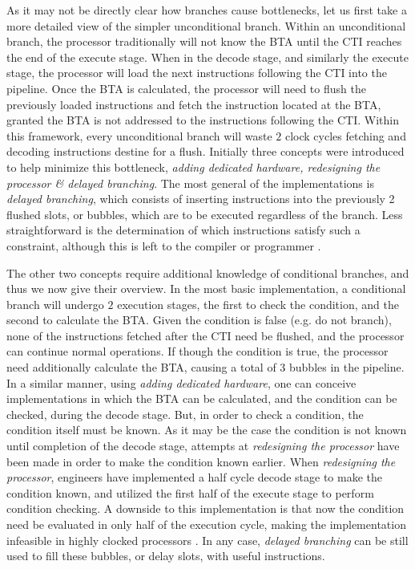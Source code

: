 \documentclass{article}
\begin{document}
As it may not be directly clear how branches cause bottlenecks, let us first take a more detailed view of the simpler unconditional branch.
Within an unconditional branch, the processor traditionally will not know the BTA until the CTI reaches the end of the execute stage.
When in the decode stage, and similarly the execute stage, the processor will load the next instructions following the CTI into the pipeline.
Once the BTA is calculated, the processor will need to flush the previously loaded instructions and fetch the instruction located at the BTA, granted the BTA is not addressed to the instructions following the CTI.
Within this framework, every unconditional branch will waste $2$ clock cycles fetching and decoding instructions destine for a flush.
Initially three concepts were introduced to help minimize this bottleneck, \emph{adding dedicated hardware, redesigning the processor \& delayed branching}.
The most general of the implementations is \emph{delayed branching}, which consists of inserting instructions into the previously 2 flushed slots, or bubbles, which are to be executed regardless of the branch.
Less straightforward is the determination of which instructions satisfy such a constraint, although this is left to the compiler or programmer \cite{Sima}.

The other two concepts require additional knowledge of conditional branches, and thus we now give their overview.
In the most basic implementation, a conditional branch will undergo $2$ execution stages, the first to check the condition, and the second to calculate the BTA.
Given the condition is false (e.g. do not branch), none of the instructions fetched after the CTI need be flushed, and the processor can continue normal operations.
If though the condition is true, the processor need additionally calculate the BTA, causing a total of $3$ bubbles in the pipeline.
In a similar manner, using \emph{adding dedicated hardware}, one can conceive implementations in which the BTA can be calculated, and the condition can be checked, during the decode stage.
But, in order to check a condition, the condition itself must be known.
As it may be the case the condition is not known until completion of the decode stage, attempts at \emph{redesigning the processor} have been made in order to make the condition known earlier.
When \emph{redesigning the processor}, engineers have implemented a half cycle decode stage to make the condition known, and utilized the first half of the execute stage to perform condition checking.
A downside to this implementation is that now the condition need be evaluated in only half of the execution cycle, making the implementation infeasible in highly clocked processors \cite{Sima}.
In any case, \emph{delayed branching} can be still used to fill these bubbles, or delay slots, with useful instructions.
\end{document}
